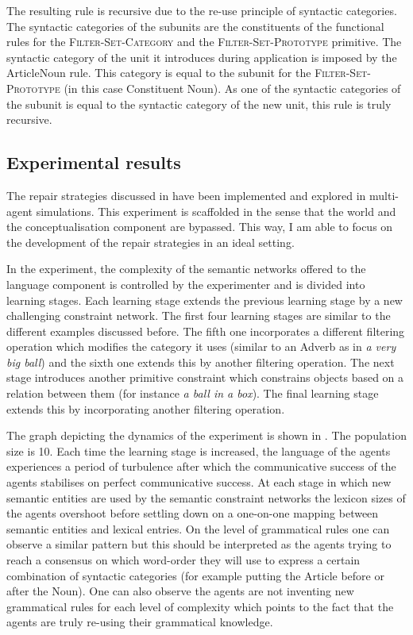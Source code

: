 The resulting rule is recursive due to the re-use principle of
syntactic categories. The syntactic categories of the subunits are
the constituents of the functional rules for the
\textsc{Filter-Set-Category} and the \textsc{Filter-Set-Prototype}
primitive. The syntactic category of the unit it introduces during
application is imposed by the ArticleNoun rule. This category is equal
to the subunit for the \textsc{Filter-Set-Prototype} (in this case
Constituent Noun). As one of the syntactic categories of the subunit
is equal to the syntactic category of the new unit, this rule is truly
recursive.

\subsection{Experimental results}
\label{s:irl-fcg-experimental-results}

The repair strategies discussed in  have been implemented and explored
in multi-agent simulations. This experiment is scaffolded in the sense
that the world and the conceptualisation component are bypassed. This
way, I am able to focus on the development of the repair strategies in
an ideal setting.

In the experiment, the complexity of the semantic networks offered to
the language component is controlled by the experimenter and is
divided into learning stages. Each learning stage extends the previous
learning stage by a new challenging constraint network. The first four
learning stages are similar to the different examples discussed
before. The fifth one incorporates a different filtering operation
which modifies the category it uses (similar to an Adverb as in \textit{a
very big ball}) and the sixth one extends this by another filtering
operation. The next stage introduces another primitive constraint
which constrains objects based on a relation between them (for
instance \textit{a ball in a box}). The final learning stage extends this
by incorporating another filtering operation.

The graph depicting the dynamics of the experiment is shown in . The population size is
10. Each time the learning stage is increased, the language of the
agents experiences a period of turbulence after which the communicative
success of the agents stabilises on perfect communicative success. At
each stage in which new semantic entities are used by the semantic
constraint networks the lexicon sizes of the agents overshoot before
settling down on a one-on-one mapping between semantic entities and
lexical entries. On the level of grammatical rules one can observe a
similar pattern but this should be interpreted as the agents trying to
reach a consensus on which word-order they will use to express a
certain combination of syntactic categories (for example putting the
Article before or after the Noun). One can also observe the agents are
not inventing new grammatical rules for each level of complexity which
points to the fact that the agents are truly re-using their
grammatical knowledge.

